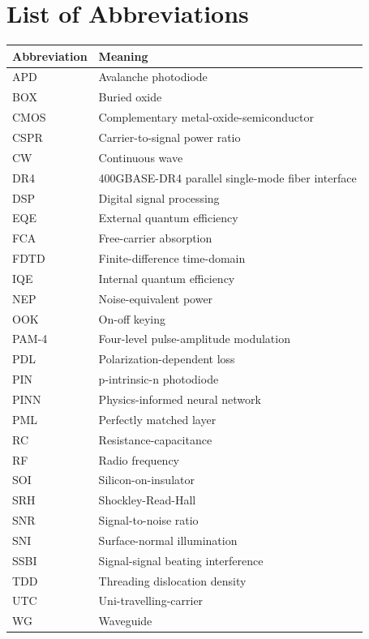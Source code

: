 \documentclass[12pt]{report}
\begin{document}
\tableofcontents
\cleardoublepage
\listoffigures
{}
\cleardoublepage
\listoftables
{}
\cleardoublepage
\chapter*{List of Abbreviations}
\begin{tabularx}{\textwidth}{L{0.18\textwidth} Y}
\toprule
Abbreviation & Meaning \\
\midrule
APD & Avalanche photodiode \\
BOX & Buried oxide \\
CMOS & Complementary metal-oxide-semiconductor \\
CSPR & Carrier-to-signal power ratio \\
CW & Continuous wave \\
DR4 & 400GBASE-DR4 parallel single-mode fiber interface \\
DSP & Digital signal processing \\
EQE & External quantum efficiency \\
FCA & Free-carrier absorption \\
FDTD & Finite-difference time-domain \\
IQE & Internal quantum efficiency \\
NEP & Noise-equivalent power \\
OOK & On-off keying \\
PAM-4 & Four-level pulse-amplitude modulation \\
PDL & Polarization-dependent loss \\
PIN & p-intrinsic-n photodiode \\
PINN & Physics-informed neural network \\
PML & Perfectly matched layer \\
RC & Resistance-capacitance \\
RF & Radio frequency \\
SOI & Silicon-on-insulator \\
SRH & Shockley-Read-Hall \\
SNR & Signal-to-noise ratio \\
SNI & Surface-normal illumination \\
SSBI & Signal-signal beating interference \\
TDD & Threading dislocation density \\
UTC & Uni-travelling-carrier \\
WG & Waveguide \\
\end{tabularx}
\cleardoublepage
\end{document}
